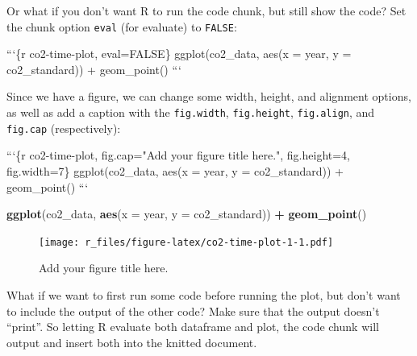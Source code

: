 \documentclass[]{Nemilov}
\newenvironment{Shaded}{\begin{snugshade}}{\end{snugshade}}
\newcommand{\BaseNTok}[1]{\textcolor[rgb]{0.00,0.00,0.81}{#1}}
\newcommand{\DataTypeTok}[1]{\textcolor[rgb]{0.13,0.29,0.53}{#1}}
\newcommand{\FunctionTok}[1]{\textcolor[rgb]{0.00,0.00,0.00}{#1}}
\newcommand{\KeywordTok}[1]{\textcolor[rgb]{0.13,0.29,0.53}{\textbf{#1}}}
\newcommand{\NormalTok}[1]{#1}
\newcommand{\OperatorTok}[1]{\textcolor[rgb]{0.81,0.36,0.00}{\textbf{#1}}}
\newcommand{\StringTok}[1]{\textcolor[rgb]{0.31,0.60,0.02}{#1}}
\begin{document}
Or what if you don't want R to run the code chunk, but still show the code? Set
the chunk option \texttt{eval} (for evaluate) to \texttt{FALSE}:

\begin{Shaded}
\begin{Highlighting}[]
\NormalTok{```\{r co2-time-plot, eval=FALSE\}}
\NormalTok{ggplot(co2_data, aes(x = year, y = co2_standard)) +}
\BaseNTok{    geom_point()}
\NormalTok{```}
\end{Highlighting}
\end{Shaded}

Since we have a figure, we can change some width, height, and alignment options,
as well as add a caption with the \texttt{fig.width}, \texttt{fig.height}, \texttt{fig.align}, and \texttt{fig.cap}
(respectively):

\begin{Shaded}
\begin{Highlighting}[]
\NormalTok{```\{r co2-time-plot, fig.cap="Add your figure title here.", fig.height=4, fig.width=7\}}
\NormalTok{ggplot(co2_data, aes(x = year, y = co2_standard)) +}
\BaseNTok{    geom_point()}
\NormalTok{```}
\end{Highlighting}
\end{Shaded}

\begin{Shaded}
\begin{Highlighting}[]
\KeywordTok{ggplot}\NormalTok{(co2_data, }\KeywordTok{aes}\NormalTok{(}\DataTypeTok{x =}\NormalTok{ year, }\DataTypeTok{y =}\NormalTok{ co2_standard)) }\OperatorTok{+}
\StringTok{    }\KeywordTok{geom_point}\NormalTok{()}
\end{Highlighting}
\end{Shaded}

\begin{figure}
\centering
\texttt{[image: r\_files/figure-latex/co2-time-plot-1-1.pdf]}
\caption{\label{fig:co2-time-plot-1}Add your figure title here.}
\end{figure}

What if we want to first run some code before running the plot, but don't want to
include the output of the other code? Make sure that the output doesn't ``print''.
So letting R evaluate both dataframe and plot, the code chunk will output and
insert both into the knitted document.

\begin{Shaded}
\end{Shaded}
\end{document}
